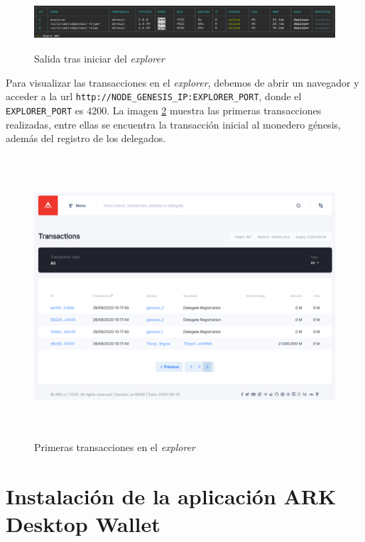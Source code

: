 \begin{figure}[H]
	\centering
	\includegraphics[width=14.5cm,height=2cm]{figuras/Instalacion_explorer.png}
	\caption{Salida tras iniciar del \textit{explorer}}
	\label{fig:install-explorer}
\end{figure}

Para visualizar las transacciones en el \textit{explorer}, debemos de abrir un navegador y acceder a la url \texttt{http://NODE\_GENESIS\_IP:EXPLORER\_PORT}, donde el \texttt{EXPLORER\_PORT} es $4200$. La imagen \ref{fig:nav-explorer} muestra las primeras transacciones realizadas, entre ellas se encuentra la transacción inicial al monedero génesis, además del registro de los delegados.

\begin{figure}[H]
	\centering
	\includegraphics[width=14.5cm,height=10.5cm]{figuras/Navegacion_explorer.png}
	\caption{Primeras transacciones en el \textit{explorer}}
	\label{fig:nav-explorer}
\end{figure}


\newpage
\section{Instalación de la aplicación ARK Desktop Wallet}
\label{sec:manual-wallet}

